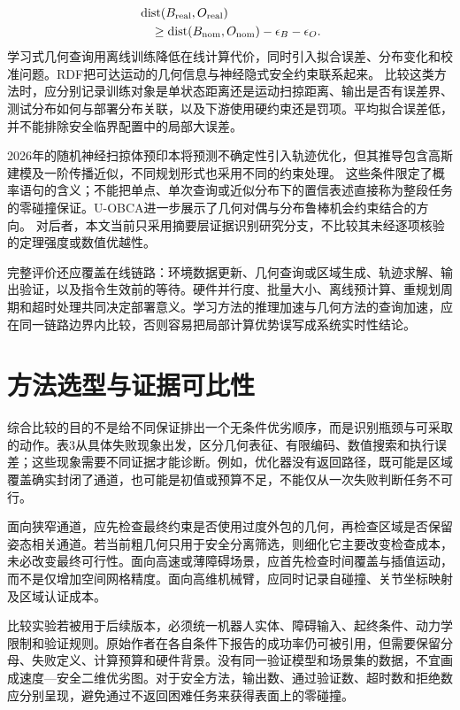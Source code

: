 \documentclass{aas}
\begin{document}
\begin{equation}
\begin{aligned}&\operatorname{dist}(B_{\rm real},O_{\rm real})\\&\quad\geq\operatorname{dist}(B_{\rm nom},O_{\rm nom})-\epsilon_B-\epsilon_O.\end{aligned}
\end{equation}
学习式几何查询用离线训练降低在线计算代价，同时引入拟合误差、分布变化和校准问题。RDF把可达运动的几何信息与神经隐式安全约束联系起来。\cite{R14} 比较这类方法时，应分别记录训练对象是单状态距离还是运动扫掠距离、输出是否有误差界、测试分布如何与部署分布关联，以及下游使用硬约束还是罚项。平均拟合误差低，并不能排除安全临界配置中的局部大误差。

2026年的随机神经扫掠体预印本将预测不确定性引入轨迹优化，但其推导包含高斯建模及一阶传播近似，不同规划形式也采用不同的约束处理。\cite{R17} 这些条件限定了概率语句的含义；不能把单点、单次查询或近似分布下的置信表述直接称为整段任务的零碰撞保证。U-OBCA进一步展示了几何对偶与分布鲁棒机会约束结合的方向。\cite{R18} 对后者，本文当前只采用摘要层证据识别研究分支，不比较其未经逐项核验的定理强度或数值优越性。

完整评价还应覆盖在线链路：环境数据更新、几何查询或区域生成、轨迹求解、输出验证，以及指令生效前的等待。硬件并行度、批量大小、离线预计算、重规划周期和超时处理共同决定部署意义。学习方法的推理加速与几何方法的查询加速，应在同一链路边界内比较，否则容易把局部计算优势误写成系统实时性结论。

\section{方法选型与证据可比性}
综合比较的目的不是给不同保证排出一个无条件优劣顺序，而是识别瓶颈与可采取的动作。表3从具体失败现象出发，区分几何表征、有限编码、数值搜索和执行误差；这些现象需要不同证据才能诊断。例如，优化器没有返回路径，既可能是区域覆盖确实封闭了通道，也可能是初值或预算不足，不能仅从一次失败判断任务不可行。

面向狭窄通道，应先检查最终约束是否使用过度外包的几何，再检查区域是否保留姿态相关通道。若当前粗几何只用于安全分离筛选，则细化它主要改变检查成本，未必改变最终可行性。面向高速或薄障碍场景，应首先检查时间覆盖与插值运动，而不是仅增加空间网格精度。面向高维机械臂，应同时记录自碰撞、关节坐标映射及区域认证成本。

比较实验若被用于后续版本，必须统一机器人实体、障碍输入、起终条件、动力学限制和验证规则。原始作者在各自条件下报告的成功率仍可被引用，但需要保留分母、失败定义、计算预算和硬件背景。没有同一验证模型和场景集的数据，不宜画成速度---安全二维优劣图。对于安全方法，输出数、通过验证数、超时数和拒绝数应分别呈现，避免通过不返回困难任务来获得表面上的零碰撞。
\end{document}
